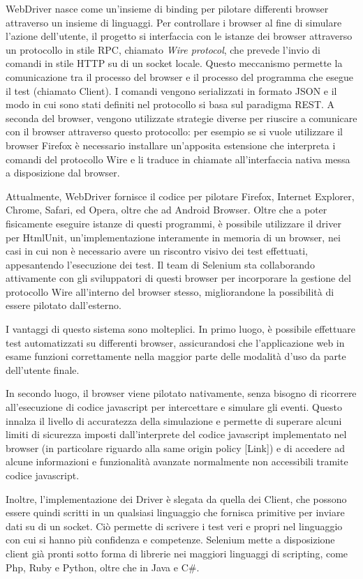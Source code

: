\documentclass[12pt]{toptesi}
\begin{document}
WebDriver nasce come un'insieme di binding per pilotare differenti browser attraverso un insieme di linguaggi. Per controllare i browser al fine di simulare l'azione dell'utente, il progetto si interfaccia con le istanze dei browser attraverso un protocollo in stile RPC, chiamato \emph{Wire protocol}, che prevede l'invio di comandi in stile HTTP su di un socket locale. Questo meccanismo permette la comunicazione tra il processo del browser e il processo del programma che esegue il test (chiamato Client). I comandi vengono serializzati in formato JSON e il modo in cui sono stati definiti nel protocollo si basa sul paradigma REST. A seconda del browser, vengono utilizzate strategie diverse per riuscire a comunicare con il browser attraverso questo protocollo: per esempio se si vuole utilizzare il browser Firefox è necessario installare un'apposita estensione che interpreta i comandi del protocollo Wire e li traduce in chiamate all'interfaccia nativa messa a disposizione dal browser. 

Attualmente, WebDriver fornisce il codice per pilotare Firefox, Internet Explorer, Chrome, Safari, ed Opera, oltre che ad Android Browser. Oltre che a poter fisicamente eseguire istanze di questi programmi, è possibile utilizzare il driver per HtmlUnit, un'implementazione interamente in memoria di un browser, nei casi in cui non è necessario avere un riscontro visivo dei test effettuati, appesantendo l'esecuzione dei test. Il team di Selenium sta collaborando attivamente con gli sviluppatori di questi browser per incorporare la gestione del protocollo Wire all'interno del browser stesso, migliorandone la possibilità di essere pilotato dall'esterno. 

I vantaggi di questo sistema sono molteplici. In primo luogo, è possibile effettuare test automatizzati su differenti browser, assicurandosi che l'applicazione web in esame funzioni correttamente nella maggior parte delle modalità d'uso da parte dell'utente finale. 

In secondo luogo, il browser viene pilotato nativamente, senza bisogno di ricorrere all'esecuzione di codice javascript per intercettare e simulare gli eventi. Questo innalza il livello di accuratezza della simulazione e permette di superare alcuni limiti di sicurezza imposti dall'interprete del codice javascript implementato nel browser (in particolare riguardo alla same origin policy [Link]) e di accedere ad alcune informazioni e funzionalità avanzate normalmente non accessibili tramite codice javascript.

Inoltre, l'implementazione dei Driver è slegata da quella dei Client, che possono essere quindi scritti in un qualsiasi linguaggio che fornisca primitive per inviare dati su di un socket. Ciò permette di scrivere i test veri e propri nel linguaggio con cui si hanno più confidenza e competenze. Selenium mette a disposizione client già pronti sotto forma di librerie nei maggiori linguaggi di scripting, come Php, Ruby e Python, oltre che in Java e C\#.
\end{document}
